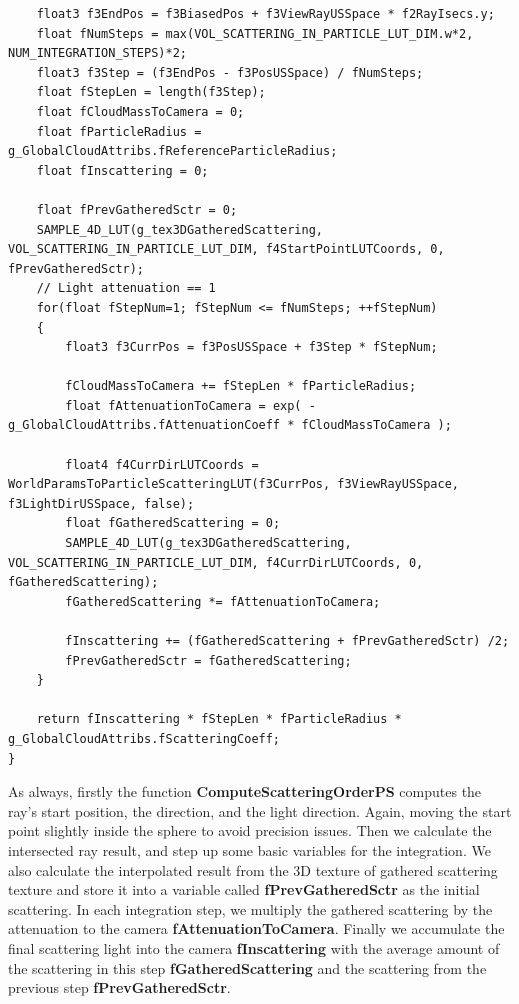 \begin{enumerate}
\begin{lstlisting}
    float3 f3EndPos = f3BiasedPos + f3ViewRayUSSpace * f2RayIsecs.y;
    float fNumSteps = max(VOL_SCATTERING_IN_PARTICLE_LUT_DIM.w*2, NUM_INTEGRATION_STEPS)*2;
    float3 f3Step = (f3EndPos - f3PosUSSpace) / fNumSteps;
    float fStepLen = length(f3Step);
    float fCloudMassToCamera = 0;
    float fParticleRadius = g_GlobalCloudAttribs.fReferenceParticleRadius;
    float fInscattering = 0;

    float fPrevGatheredSctr = 0;
    SAMPLE_4D_LUT(g_tex3DGatheredScattering, VOL_SCATTERING_IN_PARTICLE_LUT_DIM, f4StartPointLUTCoords, 0, fPrevGatheredSctr);
	// Light attenuation == 1
    for(float fStepNum=1; fStepNum <= fNumSteps; ++fStepNum)
    {
        float3 f3CurrPos = f3PosUSSpace + f3Step * fStepNum;

        fCloudMassToCamera += fStepLen * fParticleRadius;
        float fAttenuationToCamera = exp( -g_GlobalCloudAttribs.fAttenuationCoeff * fCloudMassToCamera );

        float4 f4CurrDirLUTCoords = WorldParamsToParticleScatteringLUT(f3CurrPos, f3ViewRayUSSpace, f3LightDirUSSpace, false);
        float fGatheredScattering = 0;
        SAMPLE_4D_LUT(g_tex3DGatheredScattering, VOL_SCATTERING_IN_PARTICLE_LUT_DIM, f4CurrDirLUTCoords, 0, fGatheredScattering);
        fGatheredScattering *= fAttenuationToCamera;

        fInscattering += (fGatheredScattering + fPrevGatheredSctr) /2;
        fPrevGatheredSctr = fGatheredScattering;
    }

    return fInscattering * fStepLen * fParticleRadius * g_GlobalCloudAttribs.fScatteringCoeff;
}
\end{lstlisting}

As always, firstly the function \textbf{ComputeScatteringOrderPS} computes the ray's start position, the direction, and the light direction. Again, moving the start point slightly inside the sphere to avoid precision issues. Then we calculate the intersected ray result, and step up some basic variables for the integration. We also calculate the interpolated result from the 3D texture of gathered scattering texture and store it into a variable called \textbf{fPrevGatheredSctr} as the initial scattering. In each integration step, we multiply the gathered scattering by the attenuation to the camera \textbf{fAttenuationToCamera}. Finally we accumulate the final scattering light into the camera \textbf{fInscattering} with the average amount of the scattering in this step \textbf{fGatheredScattering} and the scattering from the previous step \textbf{fPrevGatheredSctr}.


\end{enumerate}
